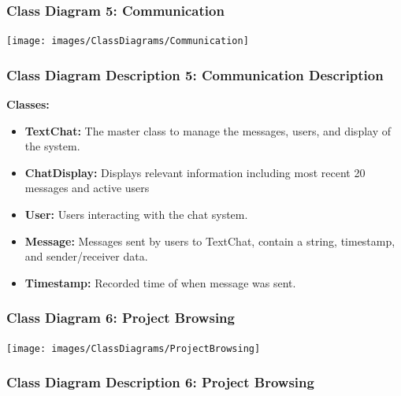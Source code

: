 \documentclass[twoside,letterpaper]{article}
\begin{document}
{\newpage
\subsubsection[Class Diagram 5: Communication]{\rmfamily\bfseries\color{black}
	Class Diagram 5: Communication}
\hypertarget{RefHeading22059017292}{}
\bigskip

\texttt{[image: images/ClassDiagrams/Communication]}

\newpage
\subsubsection[Class Diagram Description 5: Communication Description]{\rmfamily\bfseries\color{black}
	Class Diagram Description 5: Communication Description}
\hypertarget{RefHeading22059017292}{}

\textbf{Classes:}
\begin{itemize}

	\item \textbf{TextChat:} The master class to manage the messages, users, and display of the system.
	\item \textbf{ChatDisplay:} Displays relevant information including most recent 20 messages and active users
	\item \textbf{User:} Users interacting with the chat system.
	\item \textbf{Message:} Messages sent by users to TextChat, contain a string, timestamp, and sender/receiver data.
	\item \textbf{Timestamp:} Recorded time of when message was sent.
\end{itemize}
\newpage

\subsubsection[Class Diagram 6: Project Browsing]{\rmfamily\bfseries\color{black}
	Class Diagram 6: Project Browsing}
\hypertarget{RefHeading22059017292}{}
\bigskip

\texttt{[image: images/ClassDiagrams/ProjectBrowsing]}

\newpage

\subsubsection[Class Diagram Description 6: Project Browsing]{\rmfamily\bfseries\color{black}
	Class Diagram Description 6: Project Browsing}
\hypertarget{RefHeading22059017292}{}


}
\end{document}
